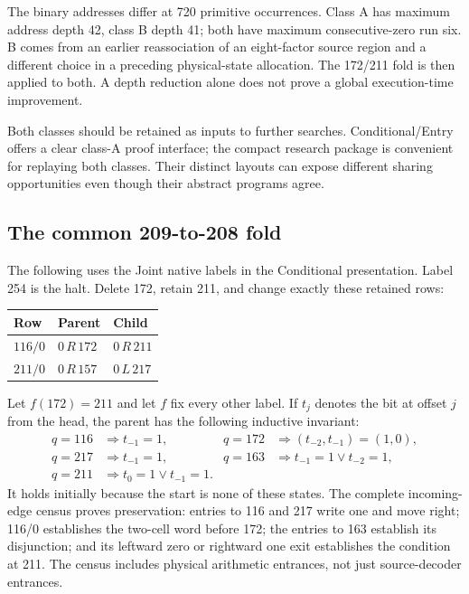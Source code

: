 \documentclass[11pt,a4paper]{article}
\theoremstyle{definition}
\begin{document}
The binary addresses differ at 720 primitive occurrences. Class A has maximum address depth 42, class B depth 41; both have maximum consecutive-zero run six. B comes from an earlier reassociation of an eight-factor source region and a different choice in a preceding physical-state allocation. The 172/211 fold is then applied to both. A depth reduction alone does not prove a global execution-time improvement.

Both classes should be retained as inputs to further searches. Conditional/Entry offers a clear class-A proof interface; the compact research package is convenient for replaying both classes. Their distinct layouts can expose different sharing opportunities even though their abstract programs agree.

\subsection{The common 209-to-208 fold}

The following uses the Joint native labels in the Conditional presentation. Label 254 is the halt. Delete 172, retain 211, and change exactly these retained rows:
\begin{center}
\begin{tabular}{@{}lll@{}}
\toprule
Row & Parent & Child\\
\midrule
$116/0$ & $0\,R\,172$ & $0\,R\,211$\\
$211/0$ & $0\,R\,157$ & $0\,L\,217$\\
\bottomrule
\end{tabular}
\end{center}
Let $f(172)=211$ and let $f$ fix every other label. If $t_j$ denotes the bit at offset $j$ from the head, the parent has the following inductive invariant:
\begin{align*}
q=116&\Rightarrow t_{-1}=1,&q=172&\Rightarrow(t_{-2},t_{-1})=(1,0),\\
q=217&\Rightarrow t_{-1}=1,&q=163&\Rightarrow t_{-1}=1\lor t_{-2}=1,\\
q=211&\Rightarrow t_0=1\lor t_{-1}=1.
\end{align*}
It holds initially because the start is none of these states. The complete incoming-edge census proves preservation: entries to 116 and 217 write one and move right; 116/0 establishes the two-cell word before 172; the entries to 163 establish its disjunction; and its leftward zero or rightward one exit establishes the condition at 211. The census includes physical arithmetic entrances, not just source-decoder entrances.
\end{document}
